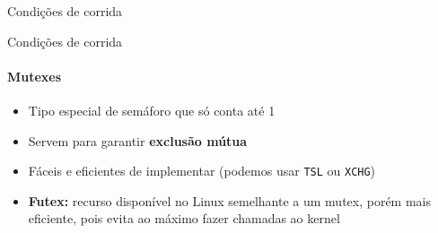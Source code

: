 \documentclass{beamer}
\begin{document}
\begin{frame}{Condições de corrida}
\begin{figure}
	\end{figure}
\end{frame}
\begin{frame}{Condições de corrida}
	\framesubtitle{Mutexes}
	\begin{itemize}
		\item Tipo especial de semáforo que só conta até 1
		\item Servem para garantir \textbf{exclusão mútua}
		\item Fáceis e eficientes de implementar (podemos usar \texttt{TSL} ou \texttt{XCHG})
		\item \textbf{Futex:} recurso disponível no Linux semelhante a um mutex, porém mais eficiente, pois evita ao máximo fazer chamadas ao kernel
	\end{itemize}
\end{frame}
\end{document}
